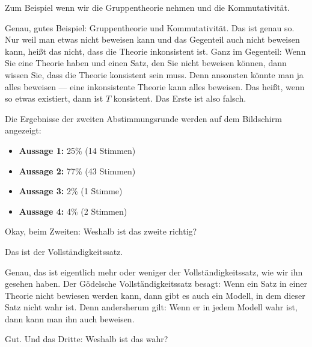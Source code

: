 \begin{student-interaction}[Studentenantwort]
Zum Beispiel wenn wir die Gruppentheorie nehmen und die Kommutativität.
\end{student-interaction}

\begin{spoken-clean}[continued]
Genau, gutes Beispiel: Gruppentheorie und Kommutativität. Das ist genau so. Nur weil man etwas nicht beweisen kann und das Gegenteil auch nicht beweisen kann, heißt das nicht, dass die Theorie inkonsistent ist. Ganz im Gegenteil: Wenn Sie eine Theorie haben und einen Satz, den Sie nicht beweisen können, dann wissen Sie, dass die Theorie konsistent sein muss. Denn ansonsten könnte man ja alles beweisen --- eine inkonsistente Theorie kann alles beweisen. Das heißt, wenn so etwas existiert, dann ist $T$ konsistent. Das Erste ist also falsch.
\end{spoken-clean}

\begin{meta-note}
Die Ergebnisse der zweiten Abstimmungsrunde werden auf dem Bildschirm angezeigt:
\begin{itemize}
    \item \textbf{Aussage 1:} 25\% (14 Stimmen)
    \item \textbf{Aussage 2:} 77\% (43 Stimmen)
    \item \textbf{Aussage 3:} 2\% (1 Stimme)
    \item \textbf{Aussage 4:} 4\% (2 Stimmen)
\end{itemize}
\end{meta-note}

\begin{spoken-clean}[00:03:18 - 00:04:12]
Okay, beim Zweiten: Weshalb ist das zweite richtig?
\end{spoken-clean}

\begin{student-interaction}[Studentenantwort]
Das ist der Vollständigkeitssatz.
\end{student-interaction}

\begin{spoken-clean}[continued]
Genau, das ist eigentlich mehr oder weniger der Vollständigkeitssatz, wie wir ihn gesehen haben. Der Gödelsche Vollständigkeitssatz besagt: Wenn ein Satz in einer Theorie nicht bewiesen werden kann, dann gibt es auch ein Modell, in dem dieser Satz nicht wahr ist. Denn andersherum gilt: Wenn er in jedem Modell wahr ist, dann kann man ihn auch beweisen.

Gut. Und das Dritte: Weshalb ist das wahr?
\end{spoken-clean}

